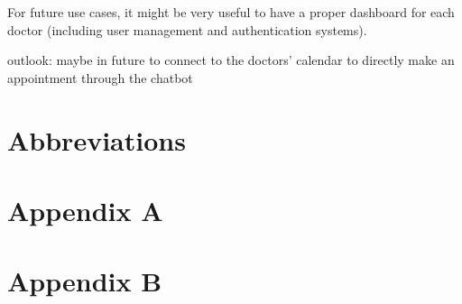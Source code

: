 For future use cases, it might be very useful to have a proper dashboard for each doctor (including user management and authentication systems). 

outlook: maybe in future to connect to the doctors' calendar to directly make an appointment through the chatbot
\chapter{Abbreviations}


\printbibliography[heading=bibintoc]

\chapter{Appendix A}\label{appendix a}

\chapter{Appendix B}\label{appendix b}



